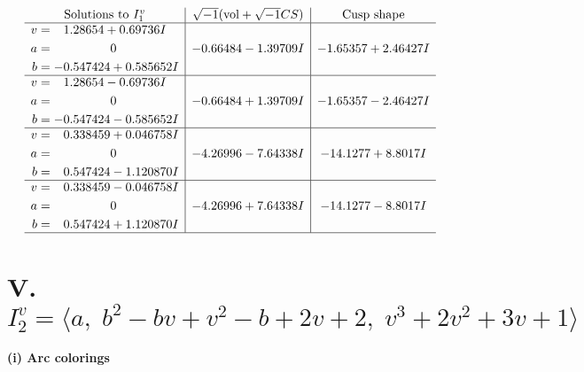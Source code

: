 \documentclass[1p]{elsarticle_modified}
\theoremstyle{definition}
\newcommand{\I}{\sqrt{-1}}
\begin{document}
$$\begin{array}{c|c|c}  
\text{Solutions to }I^v_{1}& \I (\text{vol} + \sqrt{-1}CS) & \text{Cusp shape}\\
 \hline 
\begin{aligned}
v &= \phantom{-}1.28654 + 0.69736 I \\
a &= \phantom{-0.000000 } 0 \\
b &= -0.547424 + 0.585652 I\end{aligned}
 & -0.66484 - 1.39709 I & -1.65357 + 2.46427 I \\ \hline\begin{aligned}
v &= \phantom{-}1.28654 - 0.69736 I \\
a &= \phantom{-0.000000 } 0 \\
b &= -0.547424 - 0.585652 I\end{aligned}
 & -0.66484 + 1.39709 I & -1.65357 - 2.46427 I \\ \hline\begin{aligned}
v &= \phantom{-}0.338459 + 0.046758 I \\
a &= \phantom{-0.000000 } 0 \\
b &= \phantom{-}0.547424 - 1.120870 I\end{aligned}
 & -4.26996 - 7.64338 I & -14.1277 + 8.8017 I \\ \hline\begin{aligned}
v &= \phantom{-}0.338459 - 0.046758 I \\
a &= \phantom{-0.000000 } 0 \\
b &= \phantom{-}0.547424 + 1.120870 I\end{aligned}
 & -4.26996 + 7.64338 I & -14.1277 - 8.8017 I\\
 \hline 
 \end{array}$$\newpage\newpage\renewcommand{\arraystretch}{1}
\centering \section*{V. $I^v_{2}= \langle a,\;b^2- b v+v^2- b+2 v+2,\;v^3+2 v^2+3 v+1 \rangle$}
\flushleft \textbf{(i) Arc colorings}\\
\end{document}
